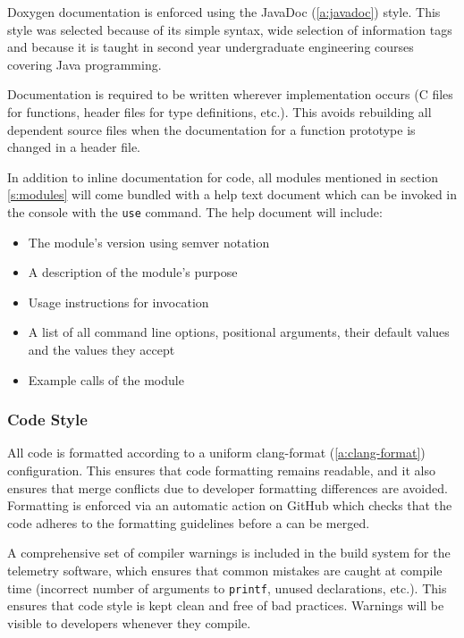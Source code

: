 Doxygen documentation is enforced using the JavaDoc (\ref{a:javadoc}) style. This style was selected because of its
simple syntax, wide selection of information tags and because it is taught in second year undergraduate engineering
courses covering Java programming.

Documentation is required to be written wherever implementation occurs (C files for functions, header files for type
definitions, etc.). This avoids rebuilding all dependent source files when the documentation for a function prototype
is changed in a header file. \cite{doxygen-headers}

In addition to inline documentation for code, all modules mentioned in section \ref{s:modules} will come bundled with a
help text document which can be invoked in the console with the \texttt{use} command. The help document will include:

\begin{itemize}
    \setlength{\itemsep}{1pt}
    \setlength{\parskip}{0pt} \setlength{\parsep}{0pt}
    \item The module's version using \gls{semver} notation
    \item A description of the module's purpose
    \item Usage instructions for invocation
    \item A list of all command line options, positional arguments, their default values and the values they accept
    \item Example calls of the module
\end{itemize}

\subsubsection{Code Style}

All code is formatted according to a uniform clang-format (\ref{a:clang-format}) configuration. This ensures that code
formatting remains readable, and it also ensures that merge conflicts due to developer formatting differences are
avoided. Formatting is enforced via an automatic action on GitHub which checks that the code adheres to the formatting
guidelines before a  can be merged.

A comprehensive set of compiler warnings is included in the build system for the telemetry software, which ensures that
common mistakes are caught at compile time (incorrect number of arguments to \texttt{printf}, unused declarations,
etc.). This ensures that code style is kept clean and free of bad practices. Warnings will be visible to developers
whenever they compile.


